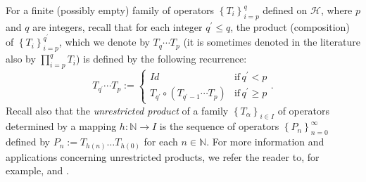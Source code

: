 \documentclass[]{interact}
\theoremstyle{plain}%
\theoremstyle{definition}
\theoremstyle{remark}
\begin{document}
\color{black}For a finite (possibly empty) family of operators $\left\{ T_{i}\right\} _{i=p}^{q}$ defined on $\mathcal{H}$, where $p$ and $q$ are integers, recall that for each integer $q^{\prime}\le q$, the product (composition) of $\left\{ T_{i}\right\} _{i=p}^{q^{\prime}}$, which we denote by $T_{q}\cdots T_{p}$ (it is  sometimes denoted in the literature also by $\prod_{i=p}^{q}T_{i}$) is defined by the following recurrence:
\[
T_{q^{\prime}}\cdots T_{p}:=\begin{cases}
Id & \mathrm{if}\,q^{\prime}<p\\
T_{q^{\prime}}\circ\left(T_{q^{\prime}-1}\cdots T_{p}\right) & \mathrm{if}\,q^{\prime}\ge p
\end{cases}.
\]\color{black}
Recall also that the \textit{\color{black}unrestricted \color{black} product} of a family $\left\{ T_{\alpha}\right\} _{i\in I}$
of operators determined by a mapping $h:\mathbb{N}\rightarrow I$
is the sequence of operators $\left\{ P_{n}\right\} _{n=0}^{\infty}$
defined by $P_{n}:=T_{h\left(n\right)}\dots T_{h\left(0\right)}$
for each $n\in\mathbb{N}$. For more information and applications
concerning \color{black}unrestricted \color{black} products, we refer the reader to, for example, \cite{key-10}
and \cite{key-1}.
\end{document}
